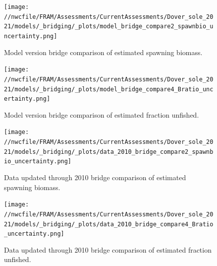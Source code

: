 \documentclass[11pt,
  english,
  a4paper,
]{article}
\begin{document}
\begin{figure}
\centering
\texttt{[image: //nwcfile/FRAM/Assessments/CurrentAssessments/Dover\_sole\_2021/models/\_bridging/\_plots/model\_bridge\_compare2\_spawnbio\_uncertainty.png]}
\caption{Model version bridge comparison of estimated spawning biomass.\label{fig:bridge-ssb}}
\end{figure}

\tagmcend\tagstructend


\begin{figure}
\centering
\texttt{[image: //nwcfile/FRAM/Assessments/CurrentAssessments/Dover\_sole\_2021/models/\_bridging/\_plots/model\_bridge\_compare4\_Bratio\_uncertainty.png]}
\caption{Model version bridge comparison of estimated fraction unfished.\label{fig:bridge-depl}}
\end{figure}

\tagmcend\tagstructend


\begin{figure}
\centering
\texttt{[image: //nwcfile/FRAM/Assessments/CurrentAssessments/Dover\_sole\_2021/models/\_bridging/\_plots/data\_2010\_bridge\_compare2\_spawnbio\_uncertainty.png]}
\caption{Data updated through 2010 bridge comparison of estimated spawning biomass.\label{fig:data-bridge-ssb}}
\end{figure}

\tagmcend\tagstructend


\begin{figure}
\centering
\texttt{[image: //nwcfile/FRAM/Assessments/CurrentAssessments/Dover\_sole\_2021/models/\_bridging/\_plots/data\_2010\_bridge\_compare4\_Bratio\_uncertainty.png]}
\caption{Data updated through 2010 bridge comparison of estimated fraction unfished.\label{fig:data-bridge-depl}}
\end{figure}

\tagmcend\tagstructend

\end{document}
